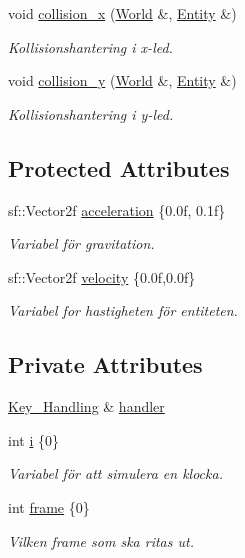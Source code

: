 \begin{DoxyCompactItemize}
void \hyperlink{classPlayer__Behaviour_a9fe9aa64239db57c6eaeb17e91d750be}{collision\+\_\+x} (\hyperlink{classWorld}{World} \&, \hyperlink{classEntity}{Entity} \&)
\begin{DoxyCompactList}\small\item\em Kollisionshantering i x-\/led. \end{DoxyCompactList}\item 
void \hyperlink{classPlayer__Behaviour_a9cec7f10ae6eb9e64d346247e3b56638}{collision\+\_\+y} (\hyperlink{classWorld}{World} \&, \hyperlink{classEntity}{Entity} \&)
\begin{DoxyCompactList}\small\item\em Kollisionshantering i y-\/led. \end{DoxyCompactList}\end{DoxyCompactItemize}
\subsection*{Protected Attributes}
\begin{DoxyCompactItemize}
\item 
sf\+::\+Vector2f \hyperlink{classBehaviour_ac17cf81ceee6a44e8a8ec6ee810c9fd3}{acceleration} \{0.\+0f, 0.\+1f\}
\begin{DoxyCompactList}\small\item\em Variabel för gravitation. \end{DoxyCompactList}\item 
sf\+::\+Vector2f \hyperlink{classBehaviour_a1d52096cf20a59890f7705acbaccf88a}{velocity} \{0.\+0f,0.\+0f\}
\begin{DoxyCompactList}\small\item\em Variabel for hastigheten för entiteten. \end{DoxyCompactList}\end{DoxyCompactItemize}
\subsection*{Private Attributes}
\begin{DoxyCompactItemize}
\item 
\hyperlink{classKey__Handling}{Key\+\_\+\+Handling} \& \hyperlink{classPlayer__Behaviour_a14e943931e401609e8182340b4a7273c}{handler}
\item 
int \hyperlink{classPlayer__Behaviour_a349e59d8a094c3f5b7263471135686bc}{i} \{0\}
\begin{DoxyCompactList}\small\item\em Variabel för att simulera en klocka. \end{DoxyCompactList}\item 
int \hyperlink{classPlayer__Behaviour_af51ca380d3847dfeee6636abf7f5a6a9}{frame} \{0\}
\begin{DoxyCompactList}\small\item\em Vilken frame som ska ritas ut. \end{DoxyCompactList}\end{DoxyCompactItemize}


